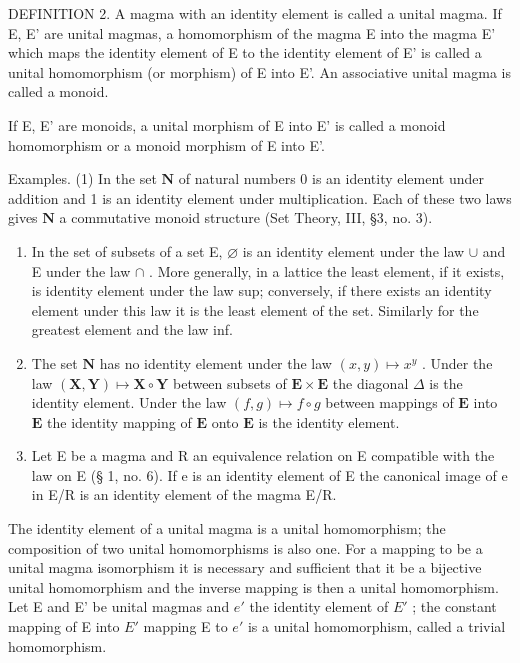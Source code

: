 DEFINITION 2. A magma with an identity element is called a unital magma. If E, E' are unital magmas, a homomorphism of the magma E into the magma E' which maps the identity element of E to the identity element of E' is called a unital homomorphism (or morphism) of E into E'. An associative unital magma is called a monoid.

If E, E' are monoids, a unital morphism of E into E' is called a monoid homomorphism or a monoid morphism of E into E'.

Examples. (1) In the set \(\mathbf{N}\) of natural numbers 0 is an identity element under addition and 1 is an identity element under multiplication. Each of these two laws gives \(\mathbf{N}\) a commutative monoid structure (Set Theory, III, §3, no. 3).

\begin{enumerate}
\def\labelenumi{(\arabic{enumi})}
\setcounter{enumi}{1}
\item
  In the set of subsets of a set E, \(\varnothing\) is an identity element under the law \(\cup\) and E under the law \(\cap\) . More generally, in a lattice the least element, if it exists, is identity element under the law sup; conversely, if there exists an identity element under this law it is the least element of the set. Similarly for the greatest element and the law inf.
\item
  The set \(\mathbf{N}\) has no identity element under the law \((x, y) \mapsto x^y\) . Under the law \((\mathbf{X}, \mathbf{Y}) \mapsto \mathbf{X} \circ \mathbf{Y}\) between subsets of \(\mathbf{E} \times \mathbf{E}\) the diagonal \(\Delta\) is the identity element. Under the law \((f, g) \mapsto f \circ g\) between mappings of \(\mathbf{E}\) into \(\mathbf{E}\) the identity mapping of \(\mathbf{E}\) onto \(\mathbf{E}\) is the identity element.
\item
  Let E be a magma and R an equivalence relation on E compatible with the law on E (§ 1, no. 6). If e is an identity element of E the canonical image of e in E/R is an identity element of the magma E/R.
\end{enumerate}

The identity element of a unital magma is a unital homomorphism; the composition of two unital homomorphisms is also one. For a mapping to be a unital magma isomorphism it is necessary and sufficient that it be a bijective unital homomorphism and the inverse mapping is then a unital homomorphism. Let E and E' be unital magmas and \(e'\) the identity element of \(E'\) ; the constant mapping of E into \(E'\) mapping E to \(e'\) is a unital homomorphism, called a trivial homomorphism.

